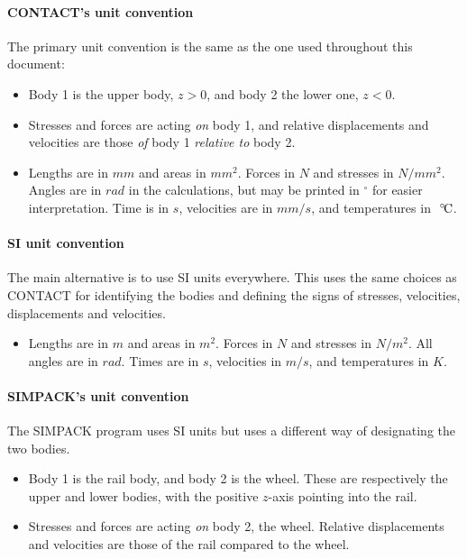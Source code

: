 \documentclass[12pt]{report}
\begin{document}
\paragraph{CONTACT's unit convention}

The primary unit convention is the same as the one used throughout this
document:
\begin{itemize}
\item Body 1 is the upper body, $z>0$, and body 2 the lower one, $z<0$.
\item Stresses and forces are acting {\em on\/} body 1, and relative
        displacements and velocities are those {\em of\/} body 1 {\em relative
        to\/} body 2.
\item Lengths are in $\unit{mm}$ and areas in $\unit{mm^2}$. Forces in
        $\unit{N}$ and stresses in $\unit{N/mm^2}$. Angles are in
        $\unit{rad}$ in the calculations, but may be printed in $^\circ$
        for easier interpretation. Time is in $\unit{s}$, velocities are
        in $\unit{mm/s}$, and temperatures in $\,\mathrm{\mbox{}^{\,\circ\!}\mathrm{C}}$.
\end{itemize}

\paragraph{SI unit convention}

The main alternative is to use SI units everywhere. This uses the same
choices as CONTACT for identifying the bodies and defining the signs of
stresses, velocities, displacements and velocities.
\begin{itemize}
\item Lengths are in $\unit{m}$ and areas in $\unit{m^2}$. Forces in
        $\unit{N}$ and stresses in $\unit{N/m^2}$. All angles are in
        $\unit{rad}$. Times are in $\unit{s}$, velocities in $\unit{m/s}$,
        and temperatures in $\unit{K}$.
\end{itemize}

\paragraph{SIMPACK's unit convention}

The SIMPACK program uses SI units but uses a different way of designating
the two bodies.
\begin{itemize}
\item Body 1 is the rail body, and body 2 is the wheel. These are
        respectively the upper and lower bodies, with the positive $z$-axis
        pointing into the rail.
\item Stresses and forces are acting {\em on\/} body 2, the wheel. Relative
        displacements and velocities are those of the rail compared to the
        wheel.
\end{itemize}
\end{document}
